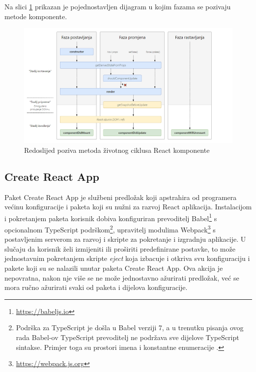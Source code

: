 \documentclass[times, utf8, diplomski, numeric]{fer}
\newcommand{\razmakp}{\vspace{18pt}}
\newcommand{\razmaks}{\vspace{10pt}}
\begin{document}
Na slici \ref{fig:react_lifecycle} prikazan je pojednostavljen dijagram u kojim fazama se pozivaju metode komponente.

\begin{figure}[!htb] %
  \centering
  \includegraphics[width=15.6cm]{images/react_life.png}
  \caption{Redoslijed poziva metoda životnog ciklusa React komponente}
  \label{fig:react_lifecycle}
  \razmakp
\end{figure}


\razmaks
\subsection{Create React App} \label{sec:cra}

Paket Create React App je službeni predložak koji apstrahira od programera većinu konfiguracije i paketa koji su nužni za razvoj React aplikacija.
Instalacijom i pokretanjem paketa korisnik dobiva konfiguriran prevoditelj Babel\footnote{\url{https://babeljs.io}} s opcionalnom TypeScript podrškom\footnote{
    Podrška za TypeScript je došla u Babel verziji 7, a u trenutku pisanja ovog rada Babel-ov TypeScript prevoditelj ne podržava sve dijelove TypeScript sintakse. Primjer toga su prostori imena  i konstantne enumeracije \citep{ms_dev_babel}.
}, upravitelj modulima Webpack\footnote{\url{https://webpack.js.org}} s postavljenim serverom za razvoj i skripte za pokretanje i izgradnju aplikacije.
U slučaju da korisnik želi izmijeniti ili proširiti predefinirane postavke, to može jednostavnim pokretanjem skripte \emph{eject} koja izbacuje i otkriva svu konfiguraciju i pakete koji su se nalazili unutar paketa Create React App.
Ova akcija je nepovratna, nakon nje više se ne može jednostavno ažurirati predložak, već se mora ručno ažurirati svaki od paketa i dijelova konfiguracije\citep{gh_cra}.
\end{document}

